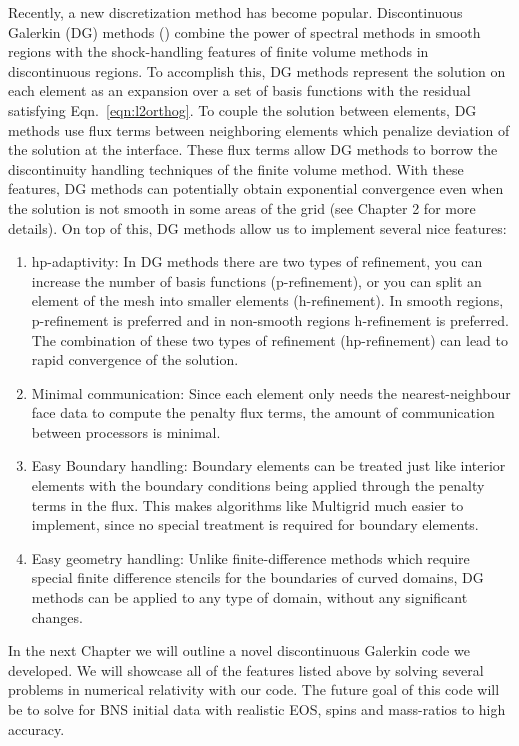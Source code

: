 Recently, a new discretization method has become popular. Discontinuous Galerkin (DG) methods (\citet*{Reed.W;Hill.T1973,hesthaven2008nodal, Cock01,cockburn1998runge,Cockburn.B1998,Cockburn.B;Karniadakis.G;Shu.C2000}) combine the power of spectral methods in smooth regions with the shock-handling features of finite volume methods in discontinuous regions. To accomplish this, DG methods represent the solution on each element as an expansion over a set of basis functions with the residual satisfying Eqn.~\ref{eqn:l2orthog}. To couple the solution between elements, DG methods use flux terms between neighboring elements which penalize deviation of the solution at the interface. These flux terms allow DG methods to borrow the discontinuity handling techniques of the finite volume method. With these features, DG methods can potentially obtain exponential convergence even when the solution is not smooth in some areas of the grid (see Chapter 2 for more details). On top of this, DG methods allow us to implement several nice features:

\begin{enumerate}
\item hp-adaptivity: In DG methods there are two types of refinement, you can increase the number of basis functions (p-refinement), or you can split an element of the mesh into smaller elements (h-refinement). In smooth regions, p-refinement is preferred and in non-smooth regions h-refinement is preferred. The combination of these two types of refinement (hp-refinement) can lead to rapid convergence of the solution.
\item Minimal communication: Since each element only needs the nearest-neighbour face data to compute the penalty flux terms, the amount of communication between processors is minimal.
\item Easy Boundary handling: Boundary elements can be treated just like interior elements with the boundary conditions being applied through the penalty terms in the flux. This makes algorithms like Multigrid much easier to implement, since no special treatment is required for boundary elements.
\item Easy geometry handling: Unlike finite-difference methods which require special finite difference stencils for the boundaries of curved domains, DG methods can be applied to any type of domain, without any significant changes.
\end{enumerate}

In the next Chapter we will outline a novel discontinuous Galerkin code we developed. We will showcase all of the features listed above by solving several problems in numerical relativity with our code. The future goal of this code will be to solve for BNS initial data with realistic EOS, spins and mass-ratios to high accuracy.


